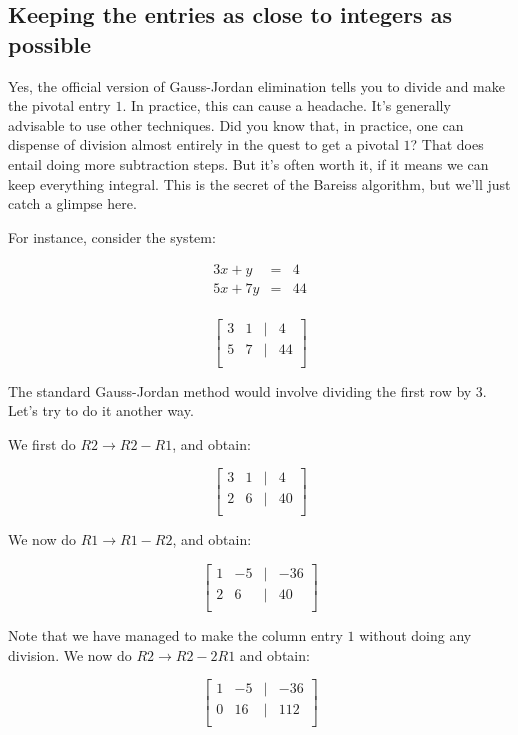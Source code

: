 \documentclass[10pt]{amsart}
\begin{document}
\subsection{Keeping the entries as close to integers as possible}\label{sec:gcd-algorithm}

Yes, the official version of Gauss-Jordan elimination tells you to
divide and make the pivotal entry $1$. In practice, this can cause a
headache. It's generally advisable to use other techniques. Did you
know that, in practice, one can dispense of division almost entirely
in the quest to get a pivotal $1$? That does entail doing more
subtraction steps. But it's often worth it, if it means we can keep
everything integral. This is the secret of the Bareiss algorithm, but
we'll just catch a glimpse here.

For instance, consider the system:

\begin{eqnarray*}
  3x + y & = & 4 \\
  5x + 7y & = & 44\\
\end{eqnarray*}


$$\left[\begin{matrix} 3 & 1 & \mid & 4\\ 5 & 7 & \mid & 44\\\end{matrix}\right]$$

The standard Gauss-Jordan method would involve dividing the first row
by $3$. Let's try to do it another way.

We first do $R2 \to R2 - R1$, and obtain:

$$\left[\begin{matrix} 3 & 1 & \mid & 4\\ 2 & 6 & \mid & 40\\\end{matrix}\right]$$

We now do $R1 \to R1 - R2$, and obtain:

$$\left[\begin{matrix} 1 & -5 & \mid & -36\\ 2 & 6 & \mid & 40\\\end{matrix}\right]$$

Note that we have managed to make the column entry $1$ without doing
any division. We now do $R2 \to R2 - 2R1$ and obtain:

$$\left[\begin{matrix} 1 & -5 & \mid & -36\\ 0 & 16 & \mid & 112\\\end{matrix}\right]$$
\end{document}
